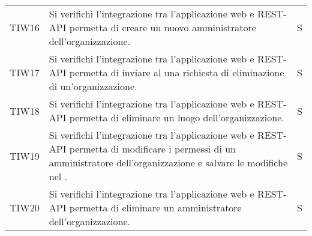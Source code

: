 {\begin{longtable}{ c C{13cm} C{1cm}}
TIW16 & Si verifichi l’integrazione tra l’applicazione web e REST-API permetta di creare un nuovo amministratore dell’organizzazione.& S \\
TIW17 & Si verifichi l’integrazione tra l’applicazione web e REST-API permetta di inviare al  una richiesta di eliminazione di un’organizzazione.& S \\
TIW18 & Si verifichi l’integrazione tra l’applicazione web e REST-API permetta di eliminare un luogo dell’organizzazione.& S \\
TIW19 & Si verifichi l’integrazione tra l’applicazione web e REST-API permetta di modificare i permessi di un amministratore dell’organizzazione e salvare le modifiche nel .& S \\
TIW20 & Si verifichi l’integrazione tra l’applicazione web e REST-API permetta di eliminare un amministratore dell’organizzazione.& S \\




\end{longtable}
}